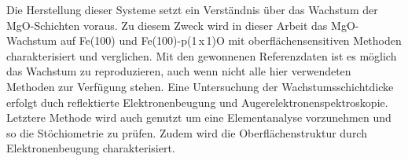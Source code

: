 Die Herstellung dieser Systeme setzt ein Verständnis über das Wachstum der MgO-Schichten voraus.
Zu diesem Zweck wird in dieser Arbeit das MgO-Wachstum auf Fe(100) und Fe(100)-p(1\,x\,1)O
mit oberflächensensitiven Methoden charakterisiert und verglichen.
Mit den gewonnenen Referenzdaten ist es möglich das Wachstum zu reproduzieren,
auch wenn nicht alle hier verwendeten Methoden zur Verfügung stehen.
Eine Untersuchung der Wachstumsschichtdicke erfolgt duch 
reflektierte Elektronenbeugung und Augerelektronenspektroskopie. 
Letztere Methode wird auch genutzt um eine Elementanalyse vorzunehmen und so die Stöchiometrie zu prüfen.
Zudem wird die Oberflächenstruktur durch Elektronenbeugung charakterisiert.

%

%
%



%



